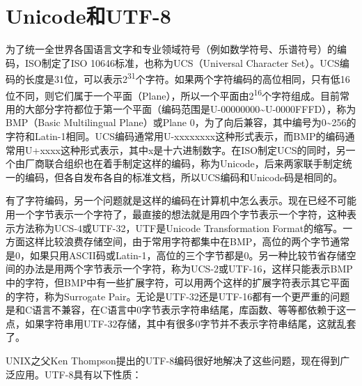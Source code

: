 
\section{Unicode和UTF-8}
%
为了统一全世界各国语言文字和专业领域符号（例如数学符号、乐谱符号）的编码，ISO制定了ISO 10646标准，也称为UCS（Universal Character Set）。UCS编码的长度是31位，可以表示2\textsuperscript{31}个字符。如果两个字符编码的高位相同，只有低16位不同，则它们属于一个平面（Plane），所以一个平面由2\textsuperscript{16}个字符组成。目前常用的大部分字符都位于第一个平面（编码范围是U-00000000\textasciitilde{}\BookSplit{}U-0000FFFD），称为BMP（Basic Multilingual Plane）或Plane 0，为了向后兼容，其中编号为0\textasciitilde{}\BookSplit{}256的字符和Latin-1相同。UCS编码通常用U-xxxxxxxx这种形式表示，而BMP的编码通常用U+\BookSplit{}xxxx这种形式表示，其中x是十六进制数字。在ISO制定UCS的同时，另一个由厂商联合组织也在着手制定这样的编码，称为Unicode，后来两家联手制定统一的编码，但各自发布各自的标准文档，所以UCS编码和Unicode码是相同的。



有了字符编码，另一个问题就是这样的编码在计算机中怎么表示。现在已经不可能用一个字节表示一个字符了，最直接的想法就是用四个字节表示一个字符，这种表示方法称为UCS-4或UTF-32，UTF是Unicode Transformation Format的缩写。一方面这样比较浪费存储空间，由于常用字符都集中在BMP，高位的两个字节通常是0，如果只用ASCII码或Latin-1，高位的三个字节都是0。另一种比较节省存储空间的办法是用两个字节表示一个字符，称为UCS-2或UTF-16，这样只能表示BMP中的字符，但BMP中有一些扩展字符，可以用两个这样的扩展字符表示其它平面的字符，称为Surrogate Pair。无论是UTF-32还是UTF-16都有一个更严重的问题是和C语言不兼容，在C语言中0字节表示字符串结尾，库函数、等等都依赖于这一点，如果字符串用UTF-32存储，其中有很多0字节并不表示字符串结尾，这就乱套了。



UNIX之父Ken Thompson提出的UTF-8编码很好地解决了这些问题，现在得到广泛应用。UTF-8具有以下性质：


